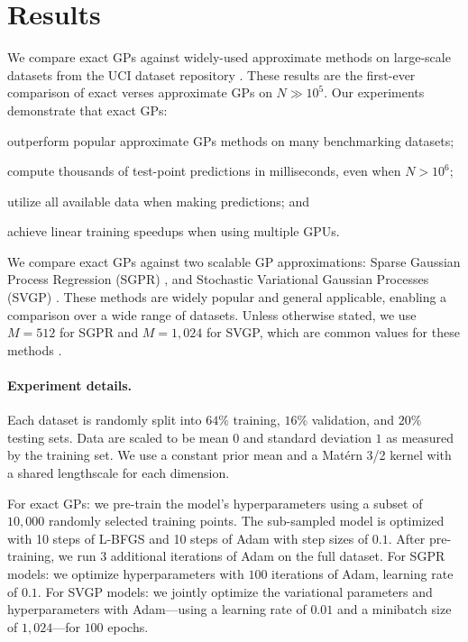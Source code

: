 \section{Results}
\label{sec:largeexact_results}

We compare exact GPs against widely-used approximate methods on large-scale datasets from the UCI dataset repository \cite{asuncion2007uci}.
These results are the first-ever comparison of exact verses approximate GPs on $N\gg 10^5$.
Our experiments demonstrate that exact GPs:
\begin{enumerate*}
  \item outperform popular approximate GPs methods on many benchmarking datasets;
  \item compute thousands of test-point predictions in milliseconds, even when $N > 10^6$;
  \item utilize all available data when making predictions; and
  \item achieve linear training speedups when using multiple GPUs.
\end{enumerate*}

We compare exact GPs against two scalable GP approximations: Sparse Gaussian Process Regression (SGPR) \cite{titsias2009variational}, and Stochastic Variational Gaussian Processes (SVGP) \cite{hensman2013gaussian}.
These methods are widely popular and general applicable, enabling a comparison over a wide range of datasets.
Unless otherwise stated, we use $M = 512$ for SGPR and $M = 1,\!024$ for SVGP, which are common values for these methods \cite{matthews2017gpflow}.

\paragraph{Experiment details.}
Each dataset is randomly split into $64\%$ training, $16\%$ validation, and $20\%$ testing sets.
Data are scaled to be mean $0$ and standard deviation $1$ as measured by the training set.
We use a constant prior mean and a Mat\'ern 3/2 kernel with a shared lengthscale for each dimension.

For exact GPs: we pre-train the model's hyperparameters using a subset of $10,\!000$ randomly selected training points.
The sub-sampled model is optimized with 10 steps of L-BFGS \citep{liu1989lbfgs} and 10 steps of Adam \citep{kingma2014adam} with step sizes of $0.1$.
After pre-training, we run 3 additional iterations of Adam on the full dataset.
For SGPR models: we optimize hyperparameters with $100$ iterations of Adam, learning rate of $0.1$.
For SVGP models: we jointly optimize the variational parameters and hyperparameters with Adam---using a learning rate of $0.01$ and a minibatch size of $1,\!024$---for $100$ epochs.

